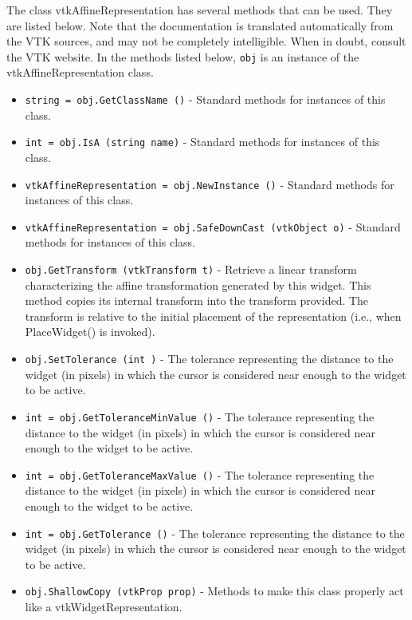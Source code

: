 The class vtkAffineRepresentation has several methods that can be used.
  They are listed below.
Note that the documentation is translated automatically from the VTK sources,
and may not be completely intelligible.  When in doubt, consult the VTK website.
In the methods listed below, \verb|obj| is an instance of the vtkAffineRepresentation class.
\begin{itemize}
\item  \verb|string = obj.GetClassName ()| -  Standard methods for instances of this class.

\item  \verb|int = obj.IsA (string name)| -  Standard methods for instances of this class.

\item  \verb|vtkAffineRepresentation = obj.NewInstance ()| -  Standard methods for instances of this class.

\item  \verb|vtkAffineRepresentation = obj.SafeDownCast (vtkObject o)| -  Standard methods for instances of this class.

\item  \verb|obj.GetTransform (vtkTransform t)| -  Retrieve a linear transform characterizing the affine transformation
 generated by this widget. This method copies its internal transform into
 the transform provided. The transform is relative to the initial placement
 of the representation (i.e., when PlaceWidget() is invoked).

\item  \verb|obj.SetTolerance (int )| -  The tolerance representing the distance to the widget (in pixels)
 in which the cursor is considered near enough to the widget to
 be active.

\item  \verb|int = obj.GetToleranceMinValue ()| -  The tolerance representing the distance to the widget (in pixels)
 in which the cursor is considered near enough to the widget to
 be active.

\item  \verb|int = obj.GetToleranceMaxValue ()| -  The tolerance representing the distance to the widget (in pixels)
 in which the cursor is considered near enough to the widget to
 be active.

\item  \verb|int = obj.GetTolerance ()| -  The tolerance representing the distance to the widget (in pixels)
 in which the cursor is considered near enough to the widget to
 be active.

\item  \verb|obj.ShallowCopy (vtkProp prop)| -  Methods to make this class properly act like a vtkWidgetRepresentation.

\end{itemize}
